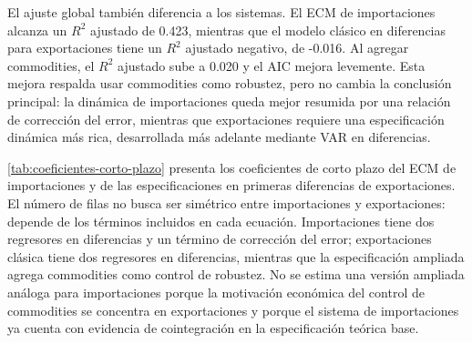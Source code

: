 \documentclass[11pt,a4paper]{article}
\begin{document}
	El ajuste global también diferencia a los sistemas. El ECM de importaciones
	alcanza un \(R^2\) ajustado de 0.423, mientras que el modelo clásico en
	diferencias para exportaciones tiene un \(R^2\) ajustado negativo, de -0.016. Al
	agregar commodities, el \(R^2\) ajustado sube a 0.020 y el AIC mejora
	levemente. Esta mejora respalda usar commodities como robustez, pero no cambia
	la conclusión principal: la dinámica de importaciones queda mejor resumida por
	una relación de corrección del error, mientras que exportaciones requiere una
	especificación dinámica más rica, desarrollada más adelante mediante VAR en
	diferencias.
	
	\autoref{tab:coeficientes-corto-plazo} presenta los coeficientes de corto plazo
	del ECM de importaciones y de las especificaciones en primeras diferencias de
	exportaciones. El número de filas no busca ser simétrico entre importaciones y
	exportaciones: depende de los términos incluidos en cada ecuación. Importaciones
	tiene dos regresores en diferencias y un término de corrección del error;
	exportaciones clásica tiene dos regresores en diferencias, mientras que la
	especificación ampliada agrega commodities como control de robustez. No se
	estima una versión ampliada análoga para importaciones porque la motivación
	económica del control de commodities se concentra en exportaciones y porque el
	sistema de importaciones ya cuenta con evidencia de cointegración en la
	especificación teórica base.
	
\end{document}
